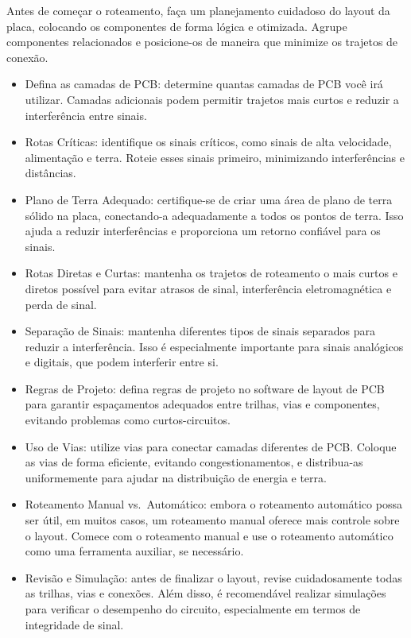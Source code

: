 Antes de começar o roteamento, faça um planejamento cuidadoso do layout da placa, colocando os componentes de forma lógica e otimizada. Agrupe componentes relacionados e posicione-os de maneira que minimize os trajetos de conexão.

\begin{itemize}
\item
  Defina as camadas de PCB: determine quantas camadas de PCB você irá utilizar. Camadas adicionais podem permitir trajetos mais curtos e reduzir a interferência entre sinais.
\item
  Rotas Críticas: identifique os sinais críticos, como sinais de alta velocidade, alimentação e terra. Roteie esses sinais primeiro, minimizando interferências e distâncias.
\item
  Plano de Terra Adequado: certifique-se de criar uma área de plano de terra sólido na placa, conectando-a adequadamente a todos os pontos de terra. Isso ajuda a reduzir interferências e proporciona um retorno confiável para os sinais.
\item
  Rotas Diretas e Curtas: mantenha os trajetos de roteamento o mais curtos e diretos possível para evitar atrasos de sinal, interferência eletromagnética e perda de sinal.
\item
  Separação de Sinais: mantenha diferentes tipos de sinais separados para reduzir a interferência. Isso é especialmente importante para sinais analógicos e digitais, que podem interferir entre si.
\item
  Regras de Projeto: defina regras de projeto no software de layout de PCB para garantir espaçamentos adequados entre trilhas, vias e componentes, evitando problemas como curtos-circuitos.
\item
  Uso de Vias: utilize vias para conectar camadas diferentes de PCB. Coloque as vias de forma eficiente, evitando congestionamentos, e distribua-as uniformemente para ajudar na distribuição de energia e terra.
\item
  Roteamento Manual vs.~Automático: embora o roteamento automático possa ser útil, em muitos casos, um roteamento manual oferece mais controle sobre o layout. Comece com o roteamento manual e use o roteamento automático como uma ferramenta auxiliar, se necessário.
\item
  Revisão e Simulação: antes de finalizar o layout, revise cuidadosamente todas as trilhas, vias e conexões. Além disso, é recomendável realizar simulações para verificar o desempenho do circuito, especialmente em termos de integridade de sinal.
\end{itemize}


